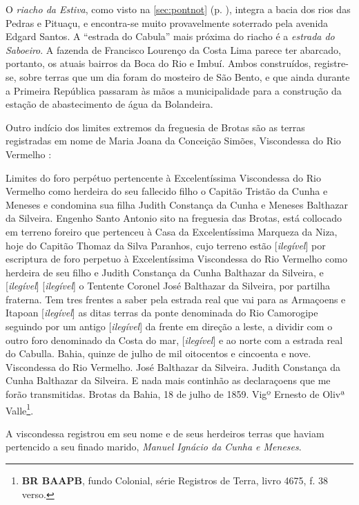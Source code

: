 O \textit{riacho da Estiva}, como visto na \autoref{sec:pontnot} (p. \pageref{sec:pontnot}), integra a bacia dos rios das Pedras e Pituaçu, e encontra-se muito provavelmente soterrado pela avenida Edgard Santos. A ``estrada do Cabula'' mais próxima do riacho é a \textit{estrada do Saboeiro}. A fazenda de Francisco Lourenço da Costa Lima parece ter abarcado, portanto, os atuais bairros da Boca do Rio e Imbuí. Ambos construídos, registre-se, sobre terras que um dia foram do mosteiro de São Bento, e que ainda durante a Primeira República passaram às mãos a municipalidade para a construção da estação de abastecimento de água da Bolandeira.

Outro indício dos limites extremos da freguesia de Brotas são as terras registradas em nome de Maria Joana da Conceição Simões, Viscondessa do Rio Vermelho \cite[p.~693]{zuquete_nobreza_1989}:

\begin{citacao}
Limites do foro perpétuo pertencente à Excelentíssima Viscondessa do Rio Vermelho como herdeira do seu fallecido filho o Capitão Tristão da Cunha e Meneses e condomina sua filha Judith Constança da Cunha e Meneses Balthazar da Silveira. Engenho Santo Antonio sito na freguesia das Brotas, está collocado em terreno foreiro que pertenceu à Casa da Excelentíssima Marqueza da Niza, hoje do Capitão Thomaz da Silva Paranhos, cujo terreno estão [\textit{ilegível}] por escriptura de foro perpetuo à Excelentíssima Viscondessa do Rio Vermelho como herdeira de seu filho e Judith Constança da Cunha Balthazar da Silveira, e [\textit{ilegível}] [\textit{ilegível}] o Tentente Coronel José Balthazar da Silveira, por partilha fraterna. Tem tres frentes a saber pela estrada real que vai para as Armaçoens e Itapoan [\textit{ilegível}] as ditas terras da ponte denominada do Rio Camorogipe seguindo por um antigo [\textit{ilegível}] da frente em direção a leste, a dividir com o outro foro denominado da Costa do mar, [\textit{ilegível}] e ao norte com a estrada real do Cabulla. Bahia, quinze de julho de mil oitocentos e cincoenta e nove. Viscondessa do Rio Vermelho. José Balthazar da Silveira. Judith Constança da Cunha Balthazar da Silveira. E nada mais continhão as declaraçoens que me forão transmitidas. Brotas da Bahia, 18 de julho de 1859. Vigº Ernesto de Olivª Valle\footnote{\textbf{BR BAAPB}, fundo Colonial, série Registros de Terra, livro 4675, f. 38 verso.}.
\end{citacao}

A viscondessa registrou em seu nome e de seus herdeiros terras que haviam pertencido a seu finado marido, \textit{Manuel Ignácio da Cunha e Meneses}.

